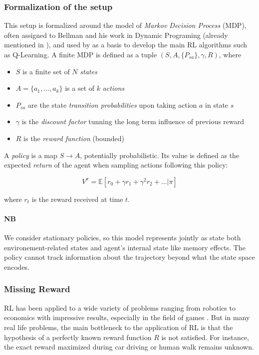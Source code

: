 \documentclass{article}
\begin{document}
\subsubsection{Formalization of the setup}

This setup is formalized around the model of \emph{Markov Decision Process} (MDP), often assigned to Bellman and his work in Dynamic Programing (already mentioned in \cite{Bellman57}), and used by \cite{Watkins89} as a basis to develop the main RL algorithms such as Q-Learning. A finite MDP is defined as a tuple $(S,A,\{P_{sa}\},\gamma,R)$, where

\begin{itemize}
    \item $S$ is a finite set of $N$ \emph{states}
    \item $A=\{a_1,...,a_k\}$ is a set of $k$ \emph{actions}
    \item $P_{sa}$ are the state \emph{transition probabilities} upon taking action $a$ in state $s$
    \item $\gamma$ is the \emph{discount factor} tunning the long term influence of previous reward
    \item $R$ is the \emph{reward function} (bounded)
\end{itemize}

A \emph{policy} is a map $S \rightarrow A$, potentially probabilistic. Its value is defined as the expected \emph{return} of the agent when sampling actions following this policy:

\[
V^{\pi} = \mathbb E[r_0 + \gamma r_1 + \gamma^2 r_2 + \dots|\pi]
\]

where $r_t$ is the reward received at time $t$.

\paragraph{NB} We consider stationary policies, so this model represents jointly as state both environement-related  states and agent's internal state like memory effects. The policy cannot track information about the trajectory beyond what the state space encodes.

\subsubsection{Missing Reward}

RL has been applied to a wide variety of problems ranging from robotics \cite{Kober13} to economics \cite{Tesauro02} with impressive results, especially in the field of games \cite{Silver16}. But in many real life problems, the main bottleneck to the application of RL is that the hypothesis of a perfectly known reward function $R$ is not satisfied. For instance, the exact reward maximized during car driving \cite{Shalev16} or human walk \cite{Morimoto04} remains unknown.
\end{document}
